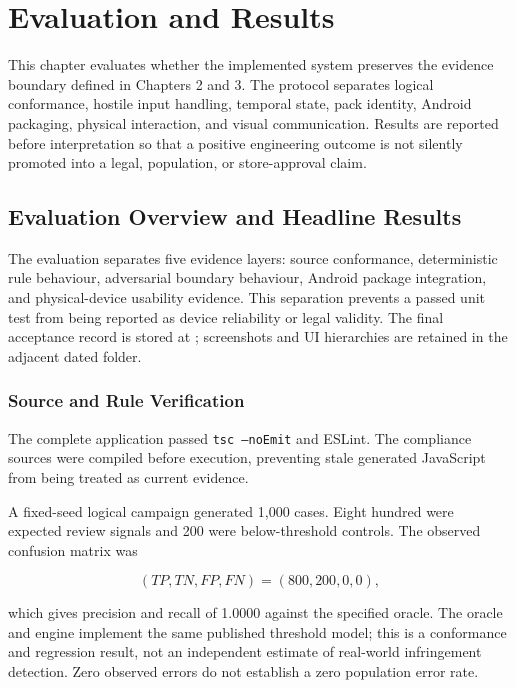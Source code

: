 \section{Evaluation and Results}

This chapter evaluates whether the implemented system preserves the evidence boundary defined in Chapters 2 and 3. The protocol separates logical conformance, hostile input handling, temporal state, pack identity, Android packaging, physical interaction, and visual communication. Results are reported before interpretation so that a positive engineering outcome is not silently promoted into a legal, population, or store-approval claim.

\subsection{Evaluation Overview and Headline Results}

The evaluation separates five evidence layers: source conformance, deterministic rule behaviour, adversarial boundary behaviour, Android package integration, and physical-device usability evidence. This separation prevents a passed unit test from being reported as device reliability or legal validity. The final acceptance record is stored at ; screenshots and UI hierarchies are retained in the adjacent dated folder.

\subsubsection{Source and Rule Verification}

The complete application passed \texttt{tsc --noEmit} and ESLint. The compliance sources were compiled before execution, preventing stale generated JavaScript from being treated as current evidence.

A fixed-seed logical campaign generated 1,000 cases. Eight hundred were expected review signals and 200 were below-threshold controls. The observed confusion matrix was

\begin{equation}
(TP,TN,FP,FN)=(800,200,0,0),
\end{equation}

which gives precision and recall of 1.0000 against the specified oracle. The oracle and engine implement the same published threshold model; this is a conformance and regression result, not an independent estimate of real-world infringement detection. Zero observed errors do not establish a zero population error rate.

